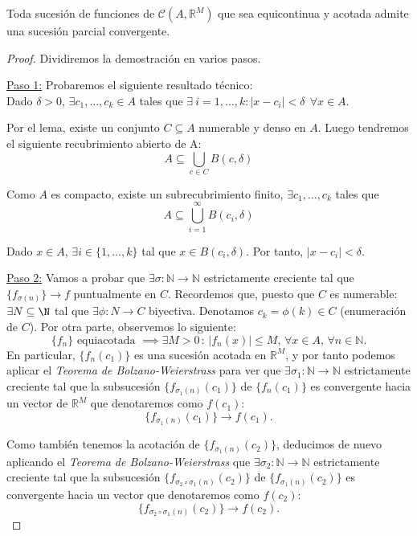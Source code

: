 \begin{nth} \label{6} Toda sucesi\'on de funciones de
  $\mathcal{C}(A,\mathbb{R}^M)$ que sea equicontinua y acotada admite
  una sucesión parcial convergente.
\end{nth}

\begin{proof} Dividiremos la demostraci\'on en varios pasos.

  \underline{Paso 1:} Probaremos el siguiente resultado técnico: \\
  Dado $\delta>0$, $\exists c_1,...,c_k \in A$ tales que
  $\exists \ i=1,\ldots,k : |x-c_i| < \delta \ \ \forall x \in A$.

  Por el lema, existe un conjunto $C \subseteq A$ numerable y denso en
  $A$. Luego tendremos el siguiente recubrimiento abierto de A:
  \[A \subseteq \bigcup\limits_{c \in C}B(c, \delta)\]

  Como $A$ es compacto, existe un subrecubrimiento finito,
  $\exists c_1,\ldots,c_k$ tales que
  \[A \subseteq \bigcup\limits_{i=1}^{\infty}B(c_i, \delta)\]

  Dado $x \in A$, $\exists i \in \{1,\ldots,k\}$ tal que
  $x \in B(c_i,\delta)$. Por tanto, $|x-c_i| <\delta$.
    
  \underline{Paso 2:} Vamos a probar que
  $\exists \sigma : \mathbb{N} \to \mathbb{N}$ estrictamente creciente
  tal que $\{f_{\sigma(n)}\} \to f$ puntualmente en $C$. Recordemos
  que, puesto que $C$ es numerable: $\exists N\subseteq \N$ tal que
  $\exists \phi :N \longrightarrow C$ biyectiva. Denotamos
  $c_k=\phi(k) \in C$ (enumeraci\'on de $C$). Por otra parte,
  observemos lo siguiente:
    \[
      \{f_n \} \mbox{ equiacotada } \implies \exists M>0 \, : \,
      |f_n(x) |\leq M , \, \forall x\in A , \, \forall n\in \mathbb N.
    \]
    En particular, $\{ f_n (c_1)\}$ es una sucesi\'on acotada en
    $\mathbb R^M$, y por tanto podemos aplicar el \textit{Teorema de
      Bolzano-Weierstrass} para ver que
    $\exists \sigma_1:\mathbb N \longrightarrow \mathbb N$
    estrictamente creciente tal que la subsucesión
    $\{ f_{\sigma_1 (n)} (c_1) \}$ de $\{ f_{n} (c_1) \}$ es
    convergente hacia un vector de $\mathbb R^M$ que denotaremos como
    $f(c_1)$:
    \[
      \{ f_{\sigma_1 (n)} (c_1) \} \longrightarrow f(c_1).
    \]

    Como también tenemos la acotaci\'on de
    $\{ f_{\sigma_1 (n)} (c_2) \} $, deducimos de nuevo aplicando el
    \textit{Teorema de Bolzano-Weierstrass} que
    $\exists \sigma_2:\mathbb N \longrightarrow \mathbb N$
    estrictamente creciente tal que la subsucesión
    $\{ f_{\sigma_2 \circ\sigma_1 (n)} (c_2) \}$ de
    $\{ f_{\sigma_1 (n)} (c_2) \}$ es convergente hacia un vector que
    denotaremos como $f(c_2)$:
    \[
      \{ f_{\sigma_2 \circ \sigma_1 (n)} (c_2) \} \longrightarrow f(c_2).
    \]


\end{proof}

